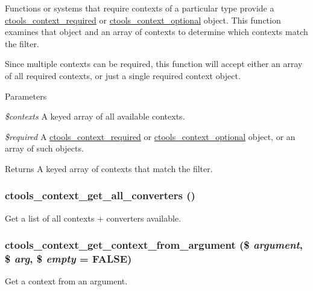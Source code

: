 Functions or systems that require contexts of a particular type provide a \hyperlink{classctools__context__required}{ctools\_\-context\_\-required} or \hyperlink{classctools__context__optional}{ctools\_\-context\_\-optional} object. This function examines that object and an array of contexts to determine which contexts match the filter.

Since multiple contexts can be required, this function will accept either an array of all required contexts, or just a single required context object.


\begin{DoxyParams}{Parameters}
\item[{\em \$contexts}]A keyed array of all available contexts. \item[{\em \$required}]A \hyperlink{classctools__context__required}{ctools\_\-context\_\-required} or \hyperlink{classctools__context__optional}{ctools\_\-context\_\-optional} object, or an array of such objects.\end{DoxyParams}
\begin{DoxyReturn}{Returns}
A keyed array of contexts that match the filter. 
\end{DoxyReturn}
\hypertarget{context_8inc_a6bc29062f0bdbfd3fb17b41115e52f59}{
\subsubsection[{ctools\_\-context\_\-get\_\-all\_\-converters}]{\setlength{\rightskip}{0pt plus 5cm}ctools\_\-context\_\-get\_\-all\_\-converters ()}}
\label{context_8inc_a6bc29062f0bdbfd3fb17b41115e52f59}
Get a list of all contexts + converters available. \hypertarget{context_8inc_a9b5a82287320cccb2cdfc67e9639ae59}{
\subsubsection[{ctools\_\-context\_\-get\_\-context\_\-from\_\-argument}]{\setlength{\rightskip}{0pt plus 5cm}ctools\_\-context\_\-get\_\-context\_\-from\_\-argument (\$ {\em argument}, \/  \$ {\em arg}, \/  \$ {\em empty} = {\ttfamily FALSE})}}
\label{context_8inc_a9b5a82287320cccb2cdfc67e9639ae59}
Get a context from an argument.



